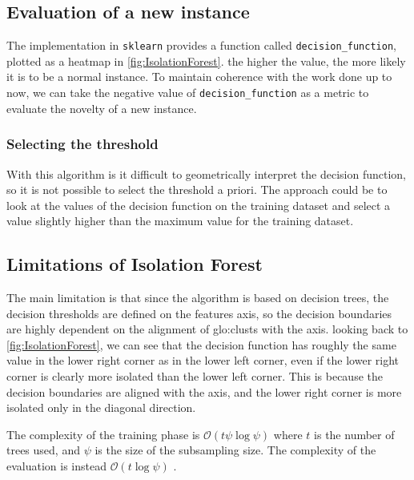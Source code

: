\subsection{Evaluation of a new instance}
\label{sec:iforest_eval}
The implementation in \texttt{sklearn} provides a function called \texttt{decision\_function}, plotted as a heatmap in \autoref{fig:IsolationForest}. the higher the value, the more likely it is to be a normal instance.
To maintain coherence with the work done up to now, we can take the negative value of \texttt{decision\_function} as a metric to evaluate the novelty of a new instance.

\subsubsection{Selecting the threshold}
\label{sec:iforest_threshold}
With this algorithm is it difficult to geometrically interpret the decision function, so it is not possible to select the threshold a priori. The approach could be to look at the values of the decision function on the training dataset and select a value slightly higher than the maximum value for the training dataset.

\subsection{Limitations of Isolation Forest}
The main limitation is that since the algorithm is based on decision trees, the decision thresholds are defined on the features axis, so the decision boundaries are highly dependent on the alignment of \gls{glo:clust}s with the axis. looking back to \autoref{fig:IsolationForest}, we can see that the decision function has roughly the same value in the lower right corner as in the lower left corner, even if the lower right corner is clearly more isolated than the lower left corner. This is because the decision boundaries are aligned with the axis, and the lower right corner is more isolated only in the diagonal direction.

The complexity of the training phase is $\mathcal{O}(t\psi\log\psi)$ where $t$ is the number of trees used, and $\psi$ is the size of the subsampling size. The complexity of the evaluation is instead $\mathcal{O}(t\log\psi)$ \cite{iforest}.